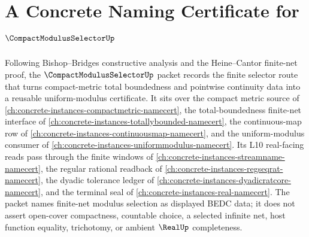 \chapter{A Concrete Naming Certificate for $\CompactModulusSelectorUp$}
\label{ch:concrete-instances-compact-modulus-selector-namecert}

Following Bishop--Bridges constructive analysis and the Heine--Cantor finite-net proof, the $\CompactModulusSelectorUp$ packet records the finite selector route that turns compact-metric total boundedness and pointwise continuity data into a reusable uniform-modulus certificate. It sits over the compact metric source of \autoref{ch:concrete-instances-compactmetric-namecert}, the total-boundedness finite-net interface of \autoref{ch:concrete-instances-totallybounded-namecert}, the continuous-map row of \autoref{ch:concrete-instances-continuousmap-namecert}, and the uniform-modulus consumer of \autoref{ch:concrete-instances-uniformmodulus-namecert}. Its L10 real-facing reads pass through the finite windows of \autoref{ch:concrete-instances-streamname-namecert}, the regular rational readback of \autoref{ch:concrete-instances-regseqrat-namecert}, the dyadic tolerance ledger of \autoref{ch:concrete-instances-dyadicratcore-namecert}, and the terminal seal of \autoref{ch:concrete-instances-real-namecert}. The packet names finite-net modulus selection as displayed BEDC data; it does not assert open-cover compactness, countable choice, a selected infinite net, host function equality, trichotomy, or ambient $\RealUp$ completeness.

